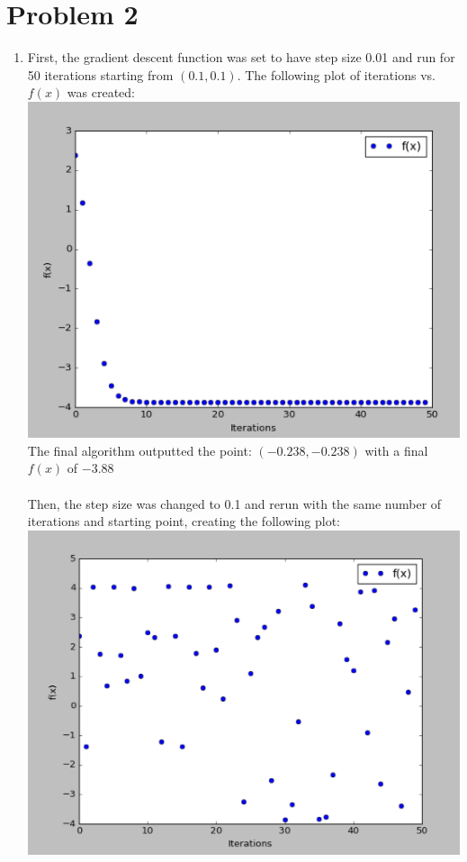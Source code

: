 \documentclass[12pt]{article}
\begin{document}
\section*{Problem 2}
\begin{enumerate}[label=(\alph*)]
	\item First, the gradient descent function was set to have step size 0.01 and run for 50 iterations starting from $(0.1, 0.1)$. The following plot of iterations vs. $f(x)$ was created:
	\\ \includegraphics[scale=.5]{2a1.png}
	\\ The final algorithm outputted the point: $\boldsymbol{(-0.238, -0.238)}$ with a final $f(x)$ of $\boldsymbol{-3.88}$
	\\ \\ Then, the step size was changed to 0.1 and rerun with the same number of iterations and starting point, creating the following plot:
	\\ \includegraphics[scale=.5]{2a2.png}

\end{enumerate}
\end{document}
